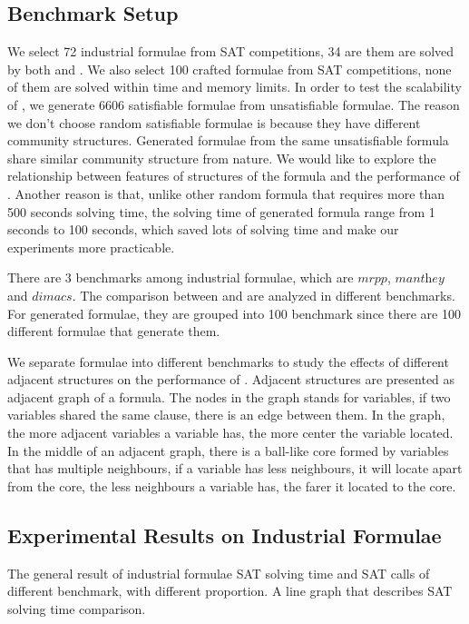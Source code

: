 \subsection{Benchmark Setup}
We select 72 industrial formulae from SAT competitions, 34 are them are solved by both \tool and \minibones. We also select 100 crafted formulae from SAT competitions, none of them are solved within time and memory limits. In order to test the scalability of \tool, we generate 6606 satisfiable formulae from unsatisfiable formulae. The reason we don't choose random satisfiable formulae is because they have different community structures. Generated formulae from the same unsatisfiable formula share similar community structure from nature. We would like to explore the relationship between features of structures of the formula and the performance of \tool. Another reason is that, unlike other random formula that requires more than 500 seconds solving time, the solving time of generated formula range from 1 seconds to 100 seconds, which saved lots of solving time and make our experiments more practicable.

There are 3 benchmarks among industrial formulae, which are $\textit{mrpp}$, $\textit{manthey}$ and $\textit{dimacs}$. The comparison between \tool and \minibones are analyzed in different benchmarks.
For generated formulae, they are grouped into 100 benchmark since there are 100 different formulae that generate them.

We separate formulae into different benchmarks to study the effects of different adjacent structures on the performance of \tool. Adjacent structures are presented as adjacent graph of a formula. The nodes in the graph stands for variables, if two variables shared the same clause, there is an edge between them. In the graph, the more adjacent variables a variable has, the more center the variable located. In the middle of an adjacent graph, there is a ball-like core formed by variables that has multiple neighbours, if a variable has less neighbours, it will locate apart from the core, the less neighbours a variable has, the farer it located to the core.

\subsection{Experimental Results on Industrial Formulae}
The general result of industrial formulae
SAT solving time and SAT calls of different benchmark, with different proportion.
A line graph that describes SAT solving time comparison.

